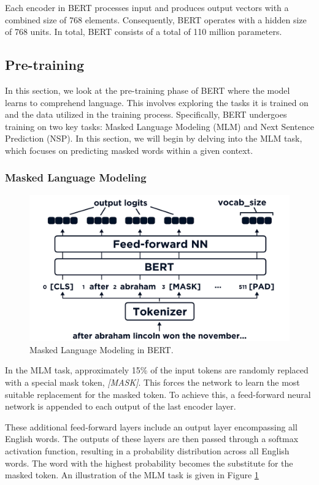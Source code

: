 \documentclass[a4paper,10pt]{report}
\begin{document}
Each encoder in BERT processes input and produces output vectors with a combined size of 768 elements. Consequently, BERT operates with a hidden size of 768 units. In total, BERT consists of a total of 110 million parameters. \cite{bert}


\subsection{Pre-training}
In this section, we look at the pre-training phase of BERT where the model learns to comprehend language. This involves exploring the tasks it is trained on and the data utilized in the training process. Specifically, BERT undergoes training on two key tasks: Masked Language Modeling (MLM) and Next Sentence Prediction (NSP). In this section, we will begin by delving into the MLM task, which focuses on predicting masked words within a given context.

\subsubsection{Masked Language Modeling}
\begin{figure}
  \centering
  \includegraphics[width=12cm]{img/mlm_bert.png}
  \caption{Masked Language Modeling in BERT. \cite{bertMLM}}
  \label{fig:mlm_bert}
\end{figure}
In the MLM task, approximately 15\% of the input tokens are randomly replaced with a special mask token, \textit{[MASK]}. This forces the network to learn the most suitable replacement for the masked token. To achieve this, a feed-forward neural network is appended to each output of the last encoder layer.

These additional feed-forward layers include an output layer encompassing all English words. The outputs of these layers are then passed through a softmax activation function, resulting in a probability distribution across all English words. The word with the highest probability becomes the substitute for the masked token. An illustration of the MLM task is given in Figure \ref{fig:mlm_bert}
\end{document}
